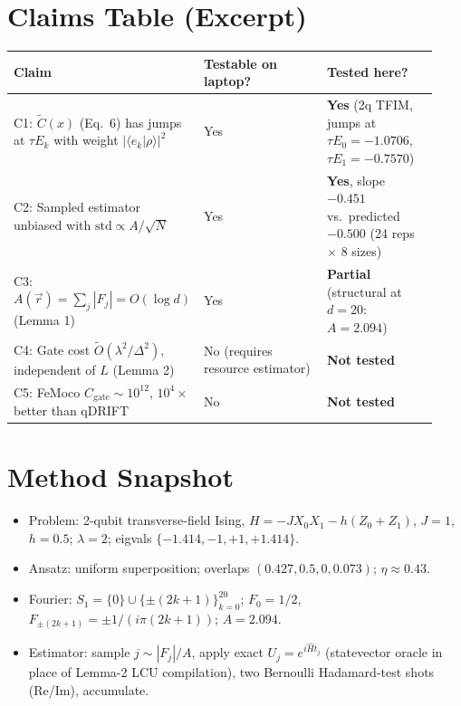 \documentclass[11pt]{article}
\begin{document}
\section{Claims Table (Excerpt)}
\begin{tabular}{@{}p{0.3\linewidth}p{0.35\linewidth}p{0.28\linewidth}@{}}
\toprule
Claim & Testable on laptop? & Tested here? \\
\midrule
C1: $\tilde C(x)$ (Eq.~6) has jumps at $\tau E_k$ with weight $|\langle e_k|\rho\rangle|^2$ & Yes &
\textbf{Yes} (2q TFIM, jumps at $\tau E_0=-1.0706$, $\tau E_1=-0.7570$) \\
C2: Sampled estimator unbiased with $\mathrm{std}\propto A/\sqrt{N}$ & Yes &
\textbf{Yes}, slope $-0.451$ vs.\ predicted $-0.500$ (24 reps $\times$ 8 sizes) \\
C3: $A(\vec r)=\sum_j|F_j|=O(\log d)$ (Lemma 1) & Yes & \textbf{Partial} (structural at $d=20$: $A=2.094$) \\
C4: Gate cost $\tilde O(\lambda^2/\Delta^2)$, independent of $L$ (Lemma 2) & No (requires resource estimator) & \textbf{Not tested} \\
C5: FeMoco $C_\text{gate}\sim 10^{12}$, $10^4\times$ better than qDRIFT & No & \textbf{Not tested} \\
\bottomrule
\end{tabular}

\section{Method Snapshot}
\begin{itemize}
\item Problem: 2-qubit transverse-field Ising, $H=-J X_0 X_1 - h(Z_0+Z_1)$, $J=1$, $h=0.5$; $\lambda=2$; eigvals $\{-1.414,-1,+1,+1.414\}$.
\item Ansatz: uniform superposition; overlaps $(0.427, 0.5, 0, 0.073)$; $\eta\approx 0.43$.
\item Fourier: $S_1=\{0\}\cup\{\pm(2k+1)\}_{k=0}^{20}$; $F_0=1/2$, $F_{\pm(2k+1)}=\pm 1/(i\pi(2k+1))$; $A=2.094$.
\item Estimator: sample $j\sim|F_j|/A$, apply exact $U_j=e^{i\hat H t_j}$ (statevector oracle in place of Lemma-2 LCU compilation), two Bernoulli Hadamard-test shots (Re/Im), accumulate.
\end{itemize}
\end{document}

